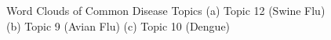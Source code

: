 \documentclass[conference]{IEEEtran}
\begin{document}
\begin{figure}[ht]
\begin{center}
\end{center}
\caption{Word Clouds of Common Disease Topics (a) Topic 12 (Swine Flu) (b) Topic 9 (Avian Flu) (c) Topic 10 (Dengue)}
\label{fig:Common_clouds}
\end{figure}

\begin{figure}[ht]
\begin{center}

\end{center}
\end{figure}
\end{document}

